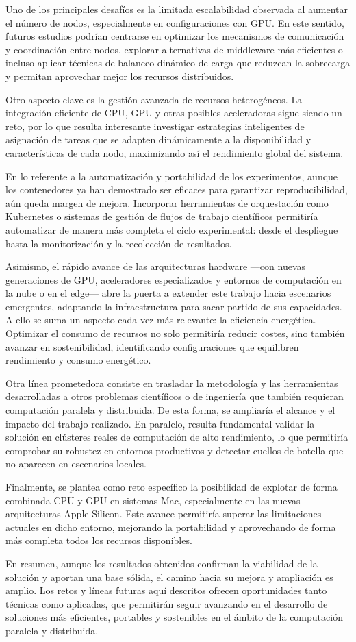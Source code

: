 Uno de los principales desafíos es la limitada escalabilidad observada al aumentar el número de nodos, especialmente en configuraciones con GPU. En este sentido, futuros estudios podrían centrarse en optimizar los mecanismos de comunicación y coordinación entre nodos, explorar alternativas de middleware más eficientes o incluso aplicar técnicas de balanceo dinámico de carga que reduzcan la sobrecarga y permitan aprovechar mejor los recursos distribuidos.

Otro aspecto clave es la gestión avanzada de recursos heterogéneos. La integración eficiente de CPU, GPU y otras posibles aceleradoras sigue siendo un reto, por lo que resulta interesante investigar estrategias inteligentes de asignación de tareas que se adapten dinámicamente a la disponibilidad y características de cada nodo, maximizando así el rendimiento global del sistema.

En lo referente a la automatización y portabilidad de los experimentos, aunque los contenedores ya han demostrado ser eficaces para garantizar reproducibilidad, aún queda margen de mejora. Incorporar herramientas de orquestación como Kubernetes o sistemas de gestión de flujos de trabajo científicos permitiría automatizar de manera más completa el ciclo experimental: desde el despliegue hasta la monitorización y la recolección de resultados.

Asimismo, el rápido avance de las arquitecturas hardware —con nuevas generaciones de GPU, aceleradores especializados y entornos de computación en la nube o en el edge— abre la puerta a extender este trabajo hacia escenarios emergentes, adaptando la infraestructura para sacar partido de sus capacidades. A ello se suma un aspecto cada vez más relevante: la eficiencia energética. Optimizar el consumo de recursos no solo permitiría reducir costes, sino también avanzar en sostenibilidad, identificando configuraciones que equilibren rendimiento y consumo energético.

Otra línea prometedora consiste en trasladar la metodología y las herramientas desarrolladas a otros problemas científicos o de ingeniería que también requieran computación paralela y distribuida. De esta forma, se ampliaría el alcance y el impacto del trabajo realizado. En paralelo, resulta fundamental validar la solución en clústeres reales de computación de alto rendimiento, lo que permitiría comprobar su robustez en entornos productivos y detectar cuellos de botella que no aparecen en escenarios locales.

Finalmente, se plantea como reto específico la posibilidad de explotar de forma combinada CPU y GPU en sistemas Mac, especialmente en las nuevas arquitecturas Apple Silicon. Este avance permitiría superar las limitaciones actuales en dicho entorno, mejorando la portabilidad y aprovechando de forma más completa todos los recursos disponibles.

En resumen, aunque los resultados obtenidos confirman la viabilidad de la solución y aportan una base sólida, el camino hacia su mejora y ampliación es amplio. Los retos y líneas futuras aquí descritos ofrecen oportunidades tanto técnicas como aplicadas, que permitirán seguir avanzando en el desarrollo de soluciones más eficientes, portables y sostenibles en el ámbito de la computación paralela y distribuida.
